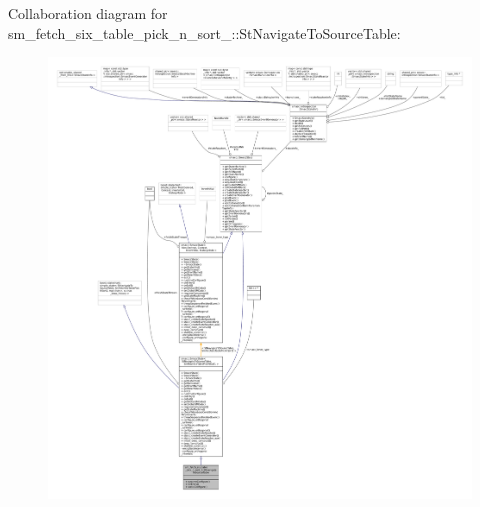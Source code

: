 Collaboration diagram for sm\+\_\+fetch\+\_\+six\+\_\+table\+\_\+pick\+\_\+n\+\_\+sort\+\_\+:\+:St\+Navigate\+To\+Source\+Table\+:
\nopagebreak
\begin{figure}[H]
\begin{center}
\leavevmode
\includegraphics[width=350pt]{structsm__fetch__six__table__pick__n__sort__1_1_1StNavigateToSourceTable__coll__graph}
\end{center}
\end{figure}
